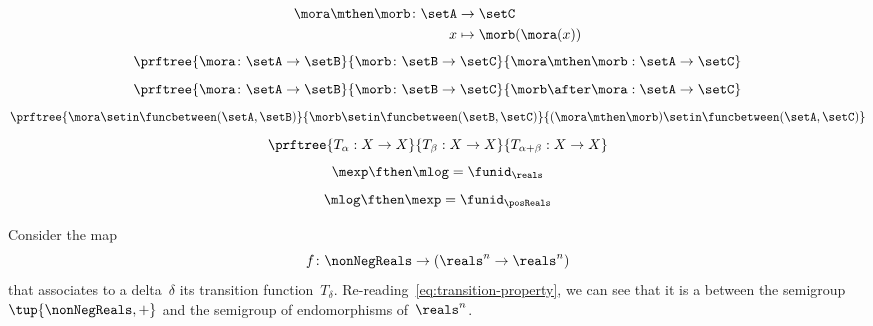 {\begin{forslides}
        \begin{equation}
            \label{eq:funcomposition}
            \begin{aligned}
                \mora \mthen \morb \colon \setA & \to  \setC \\
                x                               & \mapsto \morb(\mora(x))
            \end{aligned}
        \end{equation}
        \begin{equation}
            \label{eq:funccomp1}
            \prftree{\mora \colon \setA \to \setB}{\morb \colon \setB \to \setC}{\mora \mthen \morb : \setA \to \setC}
        \end{equation}
        \begin{equation}
            \label{eq:funccomp2}
            \prftree{\mora \colon \setA \to \setB}{\morb \colon \setB \to \setC}{\morb \after \mora : \setA \to \setC}
        \end{equation}
        \begin{equation}
            \label{eq:funccomp3}
            \prftree{%
                \mora \setin \funcbetween(\setA, \setB)}{%
                \morb \setin \funcbetween( \setB, \setC)}{
                (\mora \mthen \morb) \setin \funcbetween( \setA, \setC)}
        \end{equation}
        \begin{equation}
            \label{eq:transitions}
            \prftree{T_\alpha: X \to X }{T_\beta : X \to X}{T_{\alpha+\beta} : X \to X}
        \end{equation}
        \begin{equation}
            \label{eq:explogid}
            \mexp \fthen \mlog = \funid_{\reals}
        \end{equation}
        \begin{equation}
            \label{eq:logexpid}
            \mlog \fthen \mexp = \funid_{\posReals}
        \end{equation}
    \end{forslides}
}%

\begin{example}
    Consider the map
    \begin{equation}
        f\colon \nonNegReals \to (\reals^n \to \reals^n)
    \end{equation}
    that associates to a delta~$\delta$ its transition function~$T_\delta$.
    Re-reading~\cref{eq:transition-property}, we can see that it is a \whomo between the semigroup~$\tup{\nonNegReals,+}$ and the semigroup of endomorphisms of~$\reals^n$.
\end{example}

